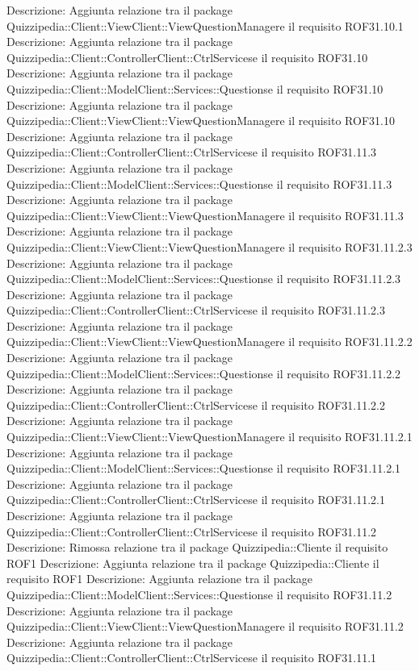 Descrizione: Aggiunta relazione tra il package Quizzipedia::Client::ViewClient::ViewQuestionManagere il requisito ROF31.10.1 
Descrizione: Aggiunta relazione tra il package Quizzipedia::Client::ControllerClient::CtrlServicese il requisito ROF31.10 
Descrizione: Aggiunta relazione tra il package Quizzipedia::Client::ModelClient::Services::Questionse il requisito ROF31.10 
Descrizione: Aggiunta relazione tra il package Quizzipedia::Client::ViewClient::ViewQuestionManagere il requisito ROF31.10 
Descrizione: Aggiunta relazione tra il package Quizzipedia::Client::ControllerClient::CtrlServicese il requisito ROF31.11.3 
Descrizione: Aggiunta relazione tra il package Quizzipedia::Client::ModelClient::Services::Questionse il requisito ROF31.11.3 
Descrizione: Aggiunta relazione tra il package Quizzipedia::Client::ViewClient::ViewQuestionManagere il requisito ROF31.11.3 
Descrizione: Aggiunta relazione tra il package Quizzipedia::Client::ViewClient::ViewQuestionManagere il requisito ROF31.11.2.3 
Descrizione: Aggiunta relazione tra il package Quizzipedia::Client::ModelClient::Services::Questionse il requisito ROF31.11.2.3 
Descrizione: Aggiunta relazione tra il package Quizzipedia::Client::ControllerClient::CtrlServicese il requisito ROF31.11.2.3 
Descrizione: Aggiunta relazione tra il package Quizzipedia::Client::ViewClient::ViewQuestionManagere il requisito ROF31.11.2.2 
Descrizione: Aggiunta relazione tra il package Quizzipedia::Client::ModelClient::Services::Questionse il requisito ROF31.11.2.2 
Descrizione: Aggiunta relazione tra il package Quizzipedia::Client::ControllerClient::CtrlServicese il requisito ROF31.11.2.2 
Descrizione: Aggiunta relazione tra il package Quizzipedia::Client::ViewClient::ViewQuestionManagere il requisito ROF31.11.2.1 
Descrizione: Aggiunta relazione tra il package Quizzipedia::Client::ModelClient::Services::Questionse il requisito ROF31.11.2.1 
Descrizione: Aggiunta relazione tra il package Quizzipedia::Client::ControllerClient::CtrlServicese il requisito ROF31.11.2.1 
Descrizione: Aggiunta relazione tra il package Quizzipedia::Client::ControllerClient::CtrlServicese il requisito ROF31.11.2 
Descrizione: Rimossa relazione tra il package Quizzipedia::Cliente il requisito ROF1 
Descrizione: Aggiunta relazione tra il package Quizzipedia::Cliente il requisito ROF1 
Descrizione: Aggiunta relazione tra il package Quizzipedia::Client::ModelClient::Services::Questionse il requisito ROF31.11.2 
Descrizione: Aggiunta relazione tra il package Quizzipedia::Client::ViewClient::ViewQuestionManagere il requisito ROF31.11.2 
Descrizione: Aggiunta relazione tra il package Quizzipedia::Client::ControllerClient::CtrlServicese il requisito ROF31.11.1 
